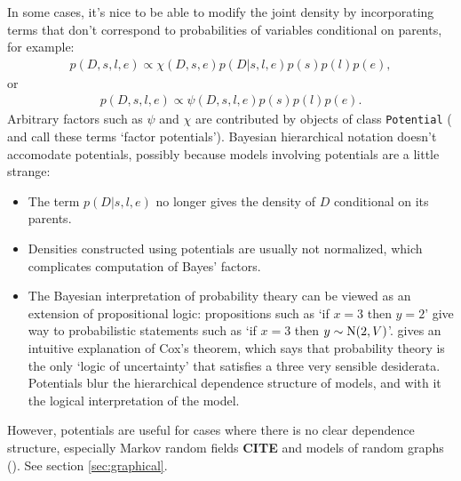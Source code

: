 In some cases, it's nice to be able to modify the joint density by incorporating terms that don't correspond to probabilities of variables conditional on parents, for example:
\begin{eqnarray*}
    p(D,s,l,e) \propto \chi(D,s,e) p(D|s,l,e) p(s) p(l) p(e),
\end{eqnarray*}
or
\begin{eqnarray*}
    p(D,s,l,e) \propto \psi(D,s,l,e) p(s) p(l) p(e).
\end{eqnarray*}
Arbitrary factors such as $\psi$ and $\chi$ are contributed by objects of class \texttt{Potential} (\cite{dawidmarkov} and \cite{jordangraphical} call these terms `factor potentials'). Bayesian hierarchical notation doesn't accomodate potentials, possibly because models involving potentials are a little strange:
\begin{itemize}
    \item The term $p(D|s,l,e)$ no longer gives the density of $D$ conditional on its parents.
    \item Densities constructed using potentials are usually not normalized, which complicates computation of Bayes' factors.
    \item The Bayesian interpretation of probability theary can be viewed as an extension of propositional logic: propositions such as `if $x=3$ then $y=2$' give way to probabilistic statements such as `if $x=3$ then $y\sim\textup N(2,V)$'. \cite{jaynes} gives an intuitive explanation of Cox's theorem, which says that probability theory is the only `logic of uncertainty' that satisfies a three very sensible desiderata. Potentials blur the hierarchical dependence structure of models, and with it the logical interpretation of the model.
\end{itemize}
However, potentials are useful for cases where there is no clear dependence structure, especially Markov random fields \textbf{CITE} and models of random graphs (\cite{durrettrandomgraph}). See section \ref{sec:graphical}.

